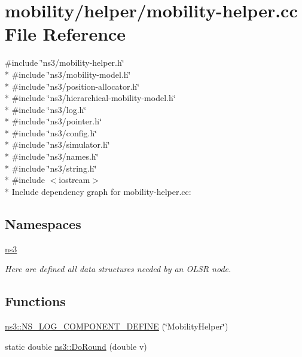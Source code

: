 \hypertarget{mobility-helper_8cc}{}\section{mobility/helper/mobility-\/helper.cc File Reference}
\label{mobility-helper_8cc}
{\ttfamily \#include \char`\"{}ns3/mobility-\/helper.\+h\char`\"{}}\\*
{\ttfamily \#include \char`\"{}ns3/mobility-\/model.\+h\char`\"{}}\\*
{\ttfamily \#include \char`\"{}ns3/position-\/allocator.\+h\char`\"{}}\\*
{\ttfamily \#include \char`\"{}ns3/hierarchical-\/mobility-\/model.\+h\char`\"{}}\\*
{\ttfamily \#include \char`\"{}ns3/log.\+h\char`\"{}}\\*
{\ttfamily \#include \char`\"{}ns3/pointer.\+h\char`\"{}}\\*
{\ttfamily \#include \char`\"{}ns3/config.\+h\char`\"{}}\\*
{\ttfamily \#include \char`\"{}ns3/simulator.\+h\char`\"{}}\\*
{\ttfamily \#include \char`\"{}ns3/names.\+h\char`\"{}}\\*
{\ttfamily \#include \char`\"{}ns3/string.\+h\char`\"{}}\\*
{\ttfamily \#include $<$iostream$>$}\\*
Include dependency graph for mobility-\/helper.cc\+:
\subsection*{Namespaces}
\begin{DoxyCompactItemize}
\item 
 \hyperlink{namespacens3}{ns3}
\begin{DoxyCompactList}\small\item\em Here are defined all data structures needed by an O\+L\+SR node. \end{DoxyCompactList}\end{DoxyCompactItemize}
\subsection*{Functions}
\begin{DoxyCompactItemize}
\item 
\hyperlink{namespacens3_a1032878fcd786b803c53726edf84e894}{ns3\+::\+N\+S\+\_\+\+L\+O\+G\+\_\+\+C\+O\+M\+P\+O\+N\+E\+N\+T\+\_\+\+D\+E\+F\+I\+NE} (\char`\"{}Mobility\+Helper\char`\"{})
\item 
static double \hyperlink{namespacens3_a0e3bb9d43a2951f6f2b845a6c5b711cc}{ns3\+::\+Do\+Round} (double v)
\end{DoxyCompactItemize}
